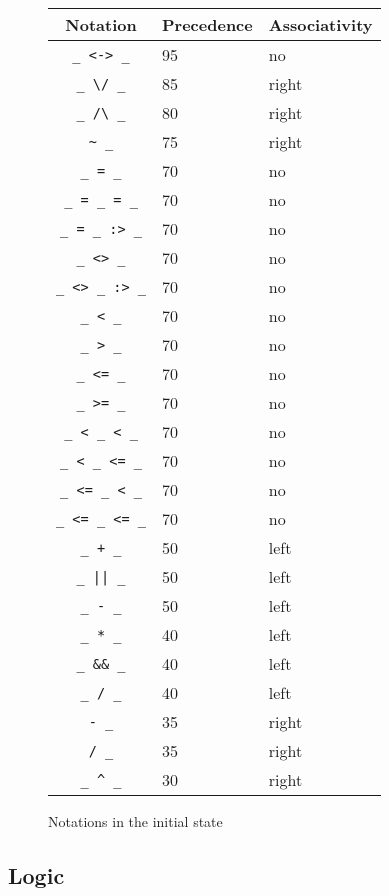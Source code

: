 \begin{figure}
\begin{center}
\begin{tabular}{|cll|}
\hline
Notation & Precedence & Associativity \\
\hline
\verb!_ <-> _! & 95 & no \\
\verb!_ \/ _!  & 85 & right \\
\verb!_ /\ _!  & 80 & right \\
\verb!~ _!   & 75 & right \\
\verb!_ = _!   & 70 & no \\
\verb!_ = _ = _!   & 70 & no \\
\verb!_ = _ :> _!   & 70 & no \\
\verb!_ <> _!  & 70 & no \\
\verb!_ <> _ :> _!  & 70 & no \\
\verb!_ < _!   & 70 & no \\
\verb!_ > _!   & 70 & no \\
\verb!_ <= _!  & 70 & no \\
\verb!_ >= _!  & 70 & no \\
\verb!_ < _ < _! & 70 & no \\
\verb!_ < _ <= _! & 70 & no \\
\verb!_ <= _ < _! & 70 & no \\
\verb!_ <= _ <= _! & 70 & no \\
\verb!_ + _!   & 50 & left \\
\verb!_ || _!  & 50 & left \\
\verb!_ - _!   & 50 & left \\
\verb!_ * _!   & 40 & left \\
\verb!_ && _!  & 40 & left \\
\verb!_ / _!   & 40 & left \\
\verb!- _!  & 35 & right \\
\verb!/ _!  & 35 & right \\
\verb!_ ^ _!   & 30 & right \\
\hline
\end{tabular}
\end{center}
\caption{Notations in the initial state}
\label{init-notations}
\end{figure}

\subsection[Logic]{Logic\label{Logic}}


